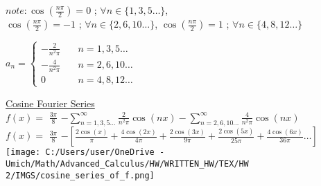 \documentclass[a4paper,man,natbib]{apa6}
\begin{document}
\begin{center}
    $ note: \cos(\frac{n\pi}{2}) = 0 $ ; $ \forall n \in \{ 1, 3, 5 \dots \} $, \\
    $ \cos(\frac{n\pi}{2}) = -1 $ ; $ \forall n \in \{ 2, 6, 10 \dots \} $, $ \cos(\frac{n\pi}{2}) = 1 $ ; $ \forall n \in \{ 4, 8, 12 \dots \} $
    
    \color{blue}
    $ a_n = \begin{cases}
        -\frac{2}{n^2\pi} & \quad n = 1, 3, 5 \dots \\
        -\frac{4}{n^2\pi} & \quad n = 2, 6, 10 \dots \\
        0 & \quad n = 4, 8, 12 \dots
    \end{cases}$ \\
    \color{black}

    \hfill \break
    \underline{Cosine Fourier Series} \\

    $ f(x) = $ \color{violet} $ \frac{3\pi}{8} $ \color{blue} $ - \sum_{n = 1, 3, 5 \dots}^{\infty} \frac{2}{n^2\pi} \cos(nx) - \sum_{n = 2, 6, 10 \dots}^{\infty} \frac{4}{n^2\pi} \cos(nx) $ \color{black} \\

    $ f(x) = $ \color{violet} $ \frac{3\pi}{8} $ \color{blue} $ -[\frac{2\cos(x)}{\pi} + \frac{4\cos(2x)}{4\pi} + \frac{2\cos(3x)}{9\pi} + \frac{2\cos(5x)}{25\pi} + \frac{4\cos(6x)}{36\pi} \dots] $ \\

    \hfill \break
    \texttt{[image: C:/Users/user/OneDrive - Umich/Math/Advanced\_Calculus/HW/WRITTEN\_HW/TEX/HW 2/IMGS/cosine\_series\_of\_f.png]} \\

\end{center}

\newpage
\end{document}
